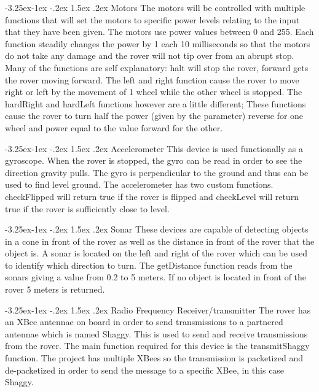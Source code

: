 \documentclass[onecolumn, draftclsnofoot, 10pt, compsoc]{IEEEtran}
\makeatletter
\renewcommand\paragraph{\@startsection{paragraph}{4}{\z@}%
                                     {-3.25ex\@plus -1ex \@minus -.2ex}%
                                     {1.5ex \@plus .2ex}%
                                     {\normalfont\normalsize\bfseries}}
\makeatother
\begin{document}
\paragraph{Motors}
The motors will be controlled with multiple functions that will set the motors to specific power levels relating to the input that they have been given. The motors use power values between 0 and 255. Each function steadily changes the power by 1 each 10 milliseconds so that the motors do not take any damage and the rover will not tip over from an abrupt stop. Many of the functions are self explanatory: halt will stop the rover, forward gets the rover moving forward. The left and right function cause the rover to move right or left by the movement of 1 wheel while the other wheel is stopped. The hardRight and hardLeft functions however are a little different; These functions cause the rover to turn half the power (given by the parameter) reverse for one wheel and power equal to the value forward for the other. 

\paragraph{Accelerometer}
This device is used functionally as a gyroscope. When the rover is stopped, the gyro can be read in order to see the direction gravity pulls. The gyro is perpendicular to the ground and thus can be used to find level ground. The accelerometer has two custom functions. checkFlipped will return true if the rover is flipped and checkLevel will return true if the rover is sufficiently close to level.

\paragraph{Sonar}
These devices are capable of detecting objects in a cone in front of the rover as well as the distance in front of the rover that the object is. A sonar is located on the left and right of the rover which can be used to identify which direction to turn. The getDistance function reads from the sonars giving a value from 0.2 to 5 meters. If no object is located in front of the rover 5 meters is returned. 

\paragraph{Radio Frequency Receiver/transmitter}
The rover has an XBee antennae on board in order to send transmissions to a partnered antennae which is named Shaggy. This is used to send and receive transmissions from the rover. The main function required for this device is the transmitShaggy function. The project has multiple XBees so the transmission is packetized and de-packetized in order to send the message to a specific XBee, in this case Shaggy.
\end{document}
